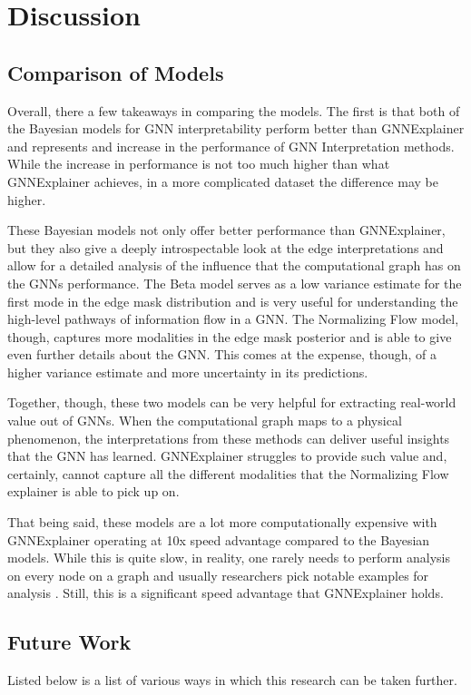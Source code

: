\section{Discussion}

\subsection{Comparison of Models}
Overall, there a few takeaways in comparing the models. The first is that both of the Bayesian models for GNN interpretability perform better than GNNExplainer and represents and increase in the performance of GNN Interpretation methods. While the increase in performance is not too much higher than what GNNExplainer achieves, in a more complicated dataset the difference may be higher.

These Bayesian models not only offer better performance than GNNExplainer, but they also give a deeply introspectable look at the edge interpretations and allow for a detailed analysis of the influence that the computational graph has on the GNNs performance. The Beta model serves as a low variance estimate for the first mode in the edge mask distribution and is very useful for understanding the high-level pathways of information flow in a GNN. The Normalizing Flow model, though, captures more modalities in the edge mask posterior and is able to give even further details about the GNN. This comes at the expense, though, of a higher variance estimate and more uncertainty in its predictions. 

Together, though, these two models can be very helpful for extracting real-world value out of GNNs. When the computational graph maps to a physical phenomenon, the interpretations from these methods can deliver useful insights that the GNN has learned. GNNExplainer struggles to provide such value and, certainly, cannot capture all the different modalities that the Normalizing Flow explainer is able to pick up on.

That being said, these models are a lot more computationally expensive with GNNExplainer operating at 10x speed advantage compared to the Bayesian models. While this is quite slow, in reality, one rarely needs to perform analysis on every node on a graph and usually researchers pick notable examples for analysis \cite{bigness_integrating_2021}. Still, this is a significant speed advantage that GNNExplainer holds. 

\subsection{Future Work}
Listed below is a list of various ways in which this research can be taken further. 


